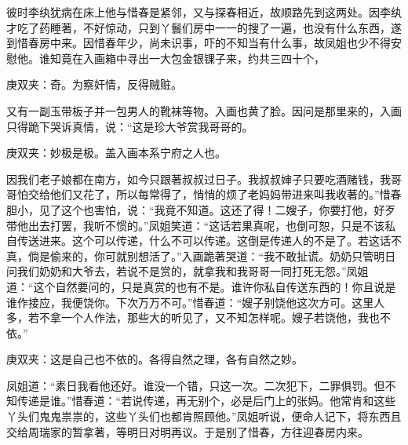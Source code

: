 \begin{parag}
\end{parag}


\begin{parag}
    彼时李纨犹病在床上他与惜春是紧邻，又与探春相近，故顺路先到这两处。因李纨才吃了药睡著，不好惊动，只到丫鬟们房中一一的搜了一遍，也没有什么东西，遂到惜春房中来。因惜春年少，尚未识事，吓的不知当有什么事，故凤姐也少不得安慰他。谁知竟在入画箱中寻出一大包金银锞子来，约共三四十个，\begin{note}庚双夹：奇。为察奸情，反得贼赃。\end{note}又有一副玉带板子并一包男人的靴袜等物。入画也黄了脸。因问是那里来的，入画只得跪下哭诉真情，说：“这是珍大爷赏我哥哥的。\begin{note}庚双夹：妙极是极。盖入画本系宁府之人也。\end{note}因我们老子娘都在南方，如今只跟著叔叔过日子。我叔叔婶子只要吃酒赌钱，我哥哥怕交给他们又花了，所以每常得了，悄悄的烦了老妈妈带进来叫我收著的。”惜春胆小，见了这个也害怕，说：“我竟不知道。这还了得！二嫂子，你要打他，好歹带他出去打罢，我听不惯的。”凤姐笑道：“这话若果真呢，也倒可恕，只是不该私自传送进来。这个可以传递，什么不可以传递。这倒是传递人的不是了。若这话不真，倘是偷来的，你可就别想活了。”入画跪著哭道：“我不敢扯谎。奶奶只管明日问我们奶奶和大爷去，若说不是赏的，就拿我和我哥哥一同打死无怨。”凤姐道：“这个自然要问的，只是真赏的也有不是。谁许你私自传送东西的！你且说是谁作接应，我便饶你。下次万万不可。”惜春道：“嫂子别饶他这次方可。这里人多，若不拿一个人作法，那些大的听见了，又不知怎样呢。嫂子若饶他，我也不依。”\begin{note}庚双夹：这是自己也不依的。各得自然之理，各有自然之妙。\end{note}凤姐道：“素日我看他还好。谁没一个错，只这一次。二次犯下，二罪俱罚。但不知传递是谁。”惜春道：“若说传递，再无别个，必是后门上的张妈。他常肯和这些丫头们鬼鬼祟祟的，这些丫头们也都肯照顾他。”凤姐听说，便命人记下，将东西且交给周瑞家的暂拿著，等明日对明再议。于是别了惜春，方往迎春房内来。
\end{parag}


